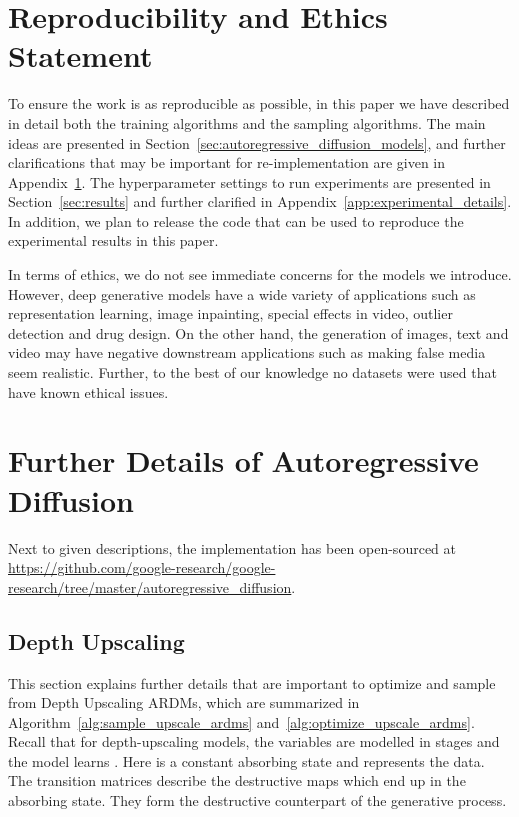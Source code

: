 \documentclass{article} \usepackage{iclr2022_conference,times}
\begin{document}
\section*{Reproducibility and Ethics Statement}
To ensure the work is as reproducible as possible, in this paper we have described in detail both the training algorithms and the sampling algorithms. The main ideas are presented in Section~\ref{sec:autoregressive_diffusion_models}, and further clarifications that may be important for re-implementation are given in Appendix~\ref{app:details_ardm}. The hyperparameter settings to run experiments are presented in Section~\ref{sec:results} and further clarified in Appendix~\ref{app:experimental_details}. In addition, we plan to release the code that can be used to reproduce the experimental results in this paper.

In terms of ethics, we do not see immediate concerns for the models we introduce. However, deep generative models have a wide variety of applications such as representation learning, image inpainting, special effects in video, outlier detection and drug design. On the other hand, the generation of images, text and video may have negative downstream applications such as making false media seem realistic. Further, to the best of our knowledge no datasets were used that have known ethical issues.








\newpage
\appendix

\newpage
\section{Further Details of Autoregressive Diffusion}
\label{app:details_ardm}

Next to given descriptions, the implementation has been open-sourced at \url{https://github.com/google-research/google-research/tree/master/autoregressive_diffusion}.


\subsection{Depth Upscaling}
This section explains further details that are important to optimize and sample from Depth Upscaling ARDMs, which are summarized in Algorithm~\ref{alg:sample_upscale_ardms} and~\ref{alg:optimize_upscale_ardms}. Recall that for depth-upscaling models, the variables are modelled in stages  and the model learns . Here  is a constant absorbing state and  represents the data. The transition matrices  describe the destructive maps which end up in the absorbing state. They form the destructive counterpart of the generative process.
\end{document}
